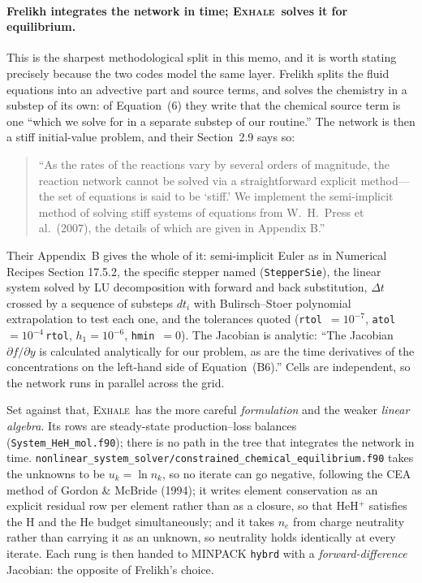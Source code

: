 \documentclass[english,a4paper]{my_memo}
\newcommand{\EXHALE}{\textsc{Exhale}}
\begin{document}
\paragraph{Frelikh integrates the network in time; \EXHALE\ solves it for
equilibrium.} This is the sharpest methodological split in this memo, and it
is worth stating precisely because the two codes model the same layer. Frelikh
splits the fluid equations into an advective part and source terms, and solves
the chemistry in a substep of its own: of Equation~(6) they write that the
chemical source term is one ``which we solve for in a separate substep of our
routine.'' The network is then a stiff initial-value problem, and their
Section~2.9 says so:
\begin{quote}\small
``As the rates of the reactions vary by several orders of magnitude, the
reaction network cannot be solved via a straightforward explicit method---the
set of equations is said to be `stiff.' We implement the semi-implicit method
of solving stiff systems of equations from W.\ H.\ Press et al.\ (2007), the
details of which are given in Appendix B.''
\end{quote}
Their Appendix~B gives the whole of it: semi-implicit Euler as in Numerical
Recipes Section 17.5.2, the specific stepper named (\texttt{StepperSie}), the
linear system solved by LU decomposition with forward and back substitution,
$\Delta t$ crossed by a sequence of substeps $dt_i$ with Bulirsch--Stoer
polynomial extrapolation to test each one, and the tolerances quoted
(\texttt{rtol}~$=10^{-7}$, \texttt{atol}~$=10^{-4}\,$\texttt{rtol},
$h_1 = 10^{-6}$, \texttt{hmin}~$=0$). The Jacobian is analytic: ``The Jacobian
$\partial f/\partial y$ is calculated analytically for our problem, as are the
time derivatives of the concentrations on the left-hand side of
Equation~(B6).'' Cells are independent, so the network runs in parallel across
the grid.

Set against that, \EXHALE\ has the more careful \emph{formulation} and the
weaker \emph{linear algebra}. Its rows are steady-state production--loss
balances (\texttt{System\_HeH\_mol.f90}); there is no path in the tree that
integrates the network in time.
\texttt{nonlinear\_system\_solver/constrained\_chemical\_equilibrium.f90}
takes the unknowns to be $u_k = \ln n_k$, so no iterate can go negative,
following the CEA method of Gordon \& McBride (1994); it writes element
conservation as an explicit residual row per element rather than as a closure,
so that HeH$^+$ satisfies the H and the He budget simultaneously; and it takes
$n_e$ from charge neutrality rather than carrying it as an unknown, so
neutrality holds identically at every iterate. Each rung is then handed to
MINPACK \texttt{hybrd} with a \emph{forward-difference} Jacobian: the
opposite of Frelikh's choice.
\end{document}
